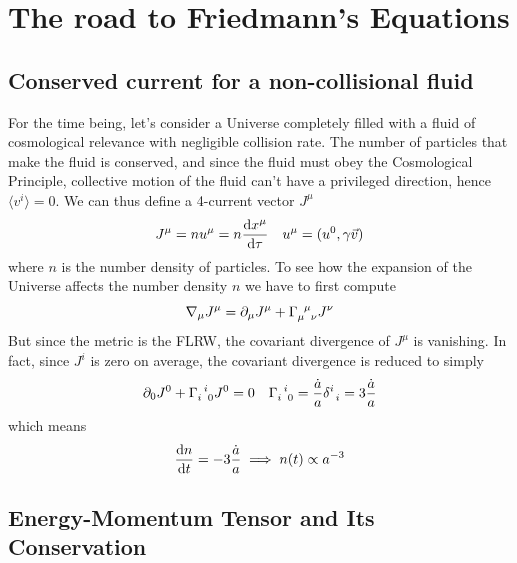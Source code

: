\section{The road to Friedmann's Equations}

\subsection*{Conserved current for a non-collisional fluid}

For the time being, let's consider a Universe completely filled with a fluid of cosmological relevance with negligible collision rate. The number of particles that make the fluid is conserved, and since the fluid must obey the Cosmological Principle, collective motion of the fluid can't have a privileged direction, hence $\langle v^{i} \rangle = 0$. We can thus define a 4-current vector $J^{\mu}$ 
\begin{equation}
    J^{\mu} = nu^{\mu} = n\frac{\text{d}x^{\mu}}{\text{d}\tau} \quad u^{\mu} = (u^{0}, \gamma\vec{v})
\end{equation}
where $n$ is the number density of particles. To see how the expansion of the Universe affects the number density $n$ we have to first compute
\begin{equation}
    \nabla_{\mu}J^{\mu} = \partial_{\mu}J^{\mu} + \Gamma_{\mu\;\;\nu}^{\;\;\mu}J^{\nu}
\end{equation}
But since the metric is the FLRW, the covariant divergence of $J^{\mu}$ is vanishing. In fact, since $J^{i}$ is zero on average, the covariant divergence is reduced to simply
\begin{equation}
    \partial_{0}J^{0} + \Gamma_{i\;\;0}^{\;\;i}J^{0} = 0 \quad \Gamma_{i\;\;0}^{\;\;i} = \frac{\dot{a}}{a}\delta^{i}_{\;\;i} = 3 \frac{\dot{a}}{a}
\end{equation}
which means
\begin{equation}
    \frac{\text{d}n}{\text{d}t} = -3\frac{\dot{a}}{a} \implies n(t)\propto a^{-3}
\end{equation}

\subsection{Energy-Momentum Tensor and Its Conservation}

